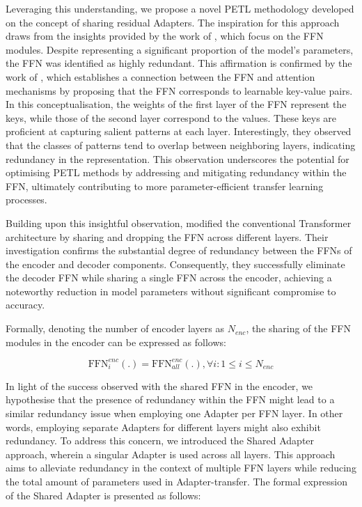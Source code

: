 Leveraging this understanding, we propose a novel PETL methodology developed on the concept of sharing residual Adapters. The inspiration for this approach draws from the insights provided by the work of \cite{pires2023one}, which focus on the FFN modules. Despite representing a significant proportion of the model's parameters, the FFN was identified as highly redundant. This affirmation is confirmed by the work of \cite{geva2020transformer}, which  establishes a connection between the FFN and attention mechanisms by proposing that the FFN corresponds to learnable key-value pairs. In this conceptualisation, the weights of the first layer of the FFN represent the keys, while those of the second layer correspond to the values. These keys are proficient at capturing salient patterns at each layer. Interestingly, they observed that the classes of patterns tend to overlap between neighboring layers, indicating redundancy in the representation. This observation underscores the potential for optimising PETL methods by addressing and mitigating redundancy within the FFN, ultimately contributing to more parameter-efficient transfer learning processes.

Building upon this insightful observation, \cite{pires2023one} modified the conventional Transformer architecture by sharing and dropping the FFN across different layers. Their investigation confirms the substantial degree of redundancy between the FFNs of the encoder and decoder components. Consequently, they successfully eliminate the decoder FFN while sharing a single FFN across the encoder, achieving a noteworthy reduction in model parameters without significant compromise to accuracy.

Formally, denoting the number of encoder layers as $N_{enc}$, the sharing of the FFN modules in the encoder can be expressed as follows:

\begin{equation}
    \text{FFN}_{i}^{enc}(.) = \text{FFN}^{enc}_{all}(.) , \forall i: 1 \leq i \leq N_{enc}
\end{equation}

In light of the success observed with the shared FFN in the encoder, we hypothesise that the presence of redundancy within the FFN might lead to a similar redundancy issue when employing one Adapter per FFN layer. In other words, employing separate Adapters for different layers might also exhibit redundancy. To address this concern, we introduced the Shared Adapter approach, wherein a singular Adapter is used across all layers. This approach aims to alleviate redundancy in the context of multiple FFN layers while reducing the total amount of parameters used in Adapter-transfer. The formal expression of the Shared Adapter is presented as follows:

